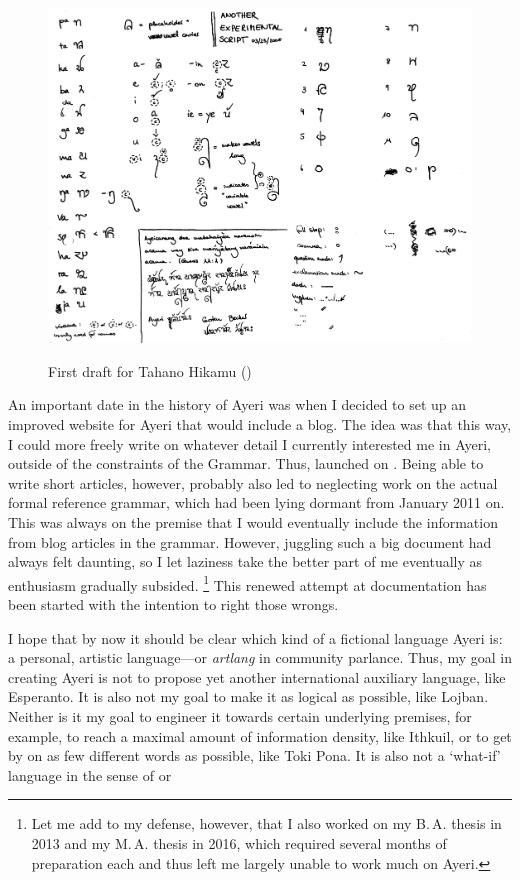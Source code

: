 \begin{figure}[tph]
	\centering
	\caption[First draft for Tahano Hikamu]{First draft for Tahano Hikamu ()}
	\includegraphics[width=\textwidth, keepaspectratio]{images/th2005-300dpi-bw.png}
	\label{fig:th2005}
\end{figure}

An important date in the history of Ayeri was when I decided to set up an 
improved website for Ayeri that would include a blog. The idea was that this 
way, I could more freely write on whatever detail I currently interested me in 
Ayeri, outside of the constraints of the Grammar. Thus,  launched on . Being able to write short 
articles, however, probably also led to neglecting work on the actual formal 
reference grammar, which had been lying dormant from January 2011 on. This was 
always on the premise that I would eventually include the information from blog 
articles in the grammar. However, juggling such a big document had always felt 
daunting, so I let laziness take the better part of me eventually as enthusiasm 
gradually subsided. \footnote{Let me add to my defense, however, that I also 
worked on my B.\,A. thesis in 2013 and my M.\,A. thesis in 2016, which required 
several months of preparation each and thus left me largely unable to work much 
on Ayeri.} This renewed attempt at documentation has been started with the 
intention to right those wrongs.

I hope that by now it should be clear which kind of a fictional language Ayeri 
is: a personal, artistic language---or \emph{artlang} in community parlance.
Thus, my goal in creating Ayeri is not to propose yet another international 
auxiliary language, like Esperanto. It is also not my goal to make it as logical 
as possible, like Lojban. Neither is it my goal to engineer it towards certain 
underlying premises, for example, to reach a maximal amount of information 
density, like Ithkuil, or to get by on as few different words as possible, like 
Toki Pona. It is also not a `what-if' language in the sense of  or 

